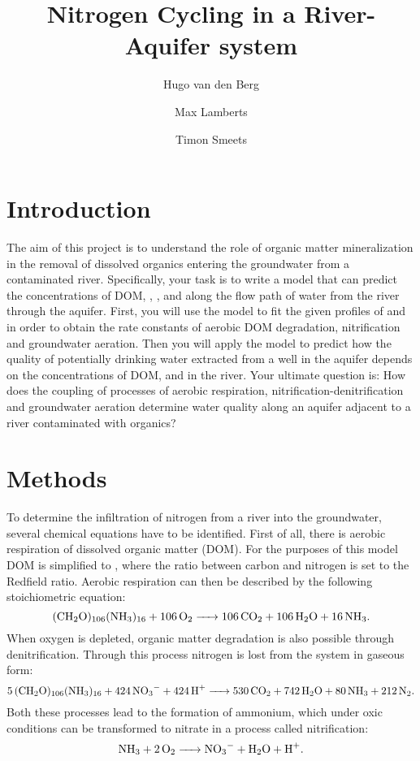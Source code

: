 \documentclass[headings=standardclasses]{scrartcl}
\title{\texorpdfstring{\vspace{-2cm}Nitrogen Cycling in a River-Aquifer system}{Nitrogen Cycling in a River-Aquifer system}}
\author{Hugo van den Berg \and Max Lamberts \and Timon Smeets}
\date{\DTMtoday\vspace{-0.5cm}}
\begin{document}
\maketitle

\section{Introduction}
The aim of this project is to understand the role of organic matter
mineralization in the removal of dissolved organics entering the groundwater
from a contaminated river. Specifically, your task is to write a model that can
predict the concentrations of DOM, , ,  and  along
the flow path of water from the river through the aquifer. First, you will use
the model to fit the given profiles of  and  in order to obtain
the rate constants of aerobic DOM degradation, nitrification and groundwater
aeration.
Then you will apply the model to predict how the quality of potentially drinking
water extracted from a well in the aquifer depends on the concentrations of DOM,
 and  in the river. Your ultimate question is: How does the
coupling of processes of aerobic respiration, nitrification-denitrification
and groundwater aeration determine water quality along an aquifer adjacent to a
river contaminated with organics?

\section{Methods}

To determine the infiltration of nitrogen from a river into the groundwater,
several chemical equations have to be identified. First of all, there is aerobic
respiration of dissolved organic matter (DOM). For the purposes of this model DOM
is simplified to , where the ratio between carbon and
nitrogen is set to the Redfield ratio. Aerobic respiration can then be described
by the following stoichiometric equation:
\begin{equation}
    \ce{(CH2O)106(NH3)16 + 106O2 -> 106CO2 + 106H2O + 16NH3}.\label{eq:stoi_aero}
\end{equation}
When oxygen is depleted, organic matter degradation is also possible through
denitrification. Through this process nitrogen is lost from the system in gaseous
form:
\begin{equation}
    \ce{5(CH2O)106(NH3)16 + 424NO3- + 424H+ -> 530CO2 + 742H2O + 80NH3 + 212N2}.\label{eq:stoi_denit}
\end{equation}
Both these processes lead to the formation of ammonium, which under oxic
conditions can be transformed to nitrate in a process called nitrification:
\begin{equation}
    \ce{NH3 + 2O2 -> NO3- + H2O + H+}.\label{eq:stoi_nit}
\end{equation}
\end{document}
